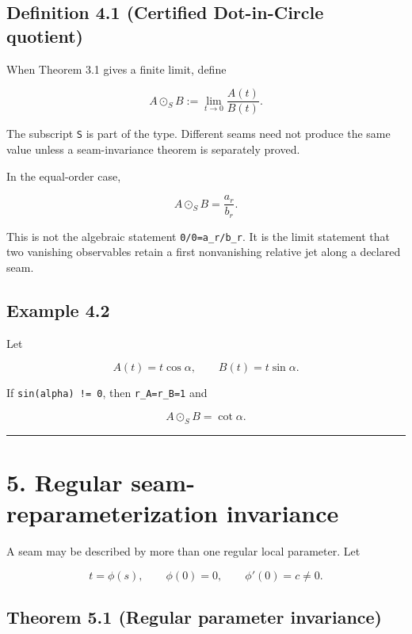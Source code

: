 \hypertarget{definition-4.1-certified-dot-in-circle-quotient}{%
\subsection{Definition 4.1 (Certified Dot-in-Circle quotient)}\label{definition-4.1-certified-dot-in-circle-quotient}}

When Theorem 3.1 gives a finite limit, define

\[
\boxed{A\odot_S B:=\lim_{t\to0}\frac{A(t)}{B(t)}.}
\tag{4.1}
\]

The subscript \texttt{S} is part of the type. Different seams need not produce the same
value unless a seam-invariance theorem is separately proved.

In the equal-order case,

\[
\boxed{A\odot_S B=\frac{a_r}{b_r}.}
\tag{4.2}
\]

This is not the algebraic statement \texttt{0/0=a\_r/b\_r}. It is the limit statement
that two vanishing observables retain a first nonvanishing relative jet along a
declared seam.

\hypertarget{example-4.2}{%
\subsection{Example 4.2}\label{example-4.2}}

Let

\[
A(t)=t\cos\alpha,
\qquad
B(t)=t\sin\alpha.
\]

If \texttt{sin(alpha)\ !=\ 0}, then \texttt{r\_A=r\_B=1} and

\[
\boxed{A\odot_S B=\cot\alpha.}
\tag{4.3}
\]

\begin{center}\rule{0.5\linewidth}{0.5pt}\end{center}

\hypertarget{regular-seam-reparameterization-invariance}{%
\section{5. Regular seam-reparameterization invariance}\label{regular-seam-reparameterization-invariance}}

A seam may be described by more than one regular local parameter. Let

\[
t=\phi(s),
\qquad
\phi(0)=0,
\qquad
\phi'(0)=c\ne0.
\tag{5.1}
\]

\hypertarget{theorem-5.1-regular-parameter-invariance}{%
\subsection{Theorem 5.1 (Regular parameter invariance)}\label{theorem-5.1-regular-parameter-invariance}}

